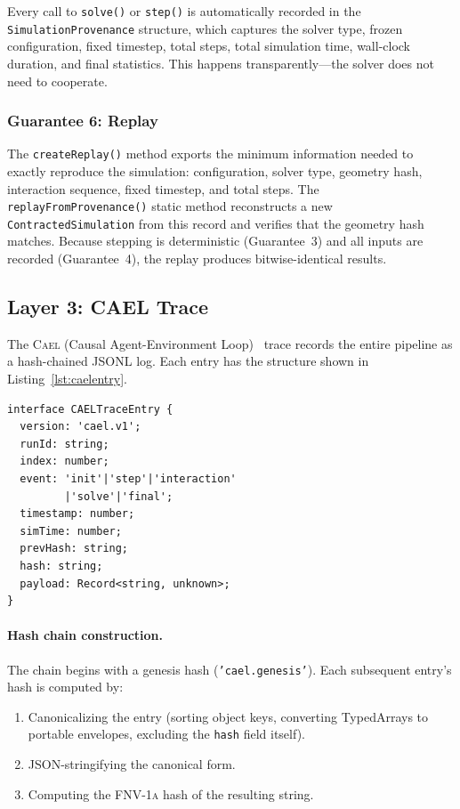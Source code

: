 \documentclass[letterpaper,twocolumn,10pt]{article}
\newcommand{\cael}{\textsc{Cael}}
\newcommand{\fnvhash}{\textsc{FNV-1a}}
\begin{document}
Every call to \texttt{solve()} or \texttt{step()} is automatically
recorded in the \texttt{SimulationProvenance} structure, which captures
the solver type, frozen configuration, fixed timestep, total steps,
total simulation time, wall-clock duration, and final statistics. This
happens transparently---the solver does not need to cooperate.

\subsubsection{Guarantee 6: Replay}

The \texttt{createReplay()} method exports the minimum information
needed to exactly reproduce the simulation: configuration, solver type,
geometry hash, interaction sequence, fixed timestep, and total steps.
The \texttt{replayFromProvenance()} static method reconstructs a new
\texttt{ContractedSimulation} from this record and verifies that the
geometry hash matches. Because stepping is deterministic (Guarantee~3)
and all inputs are recorded (Guarantee~4), the replay produces
bitwise-identical results.

\subsection{Layer 3: CAEL Trace}

The \cael{} (Causal Agent-Environment Loop)~\cite{cael-paper} trace records the
entire pipeline as a hash-chained JSONL log. Each entry has the
structure shown in Listing~\ref{lst:caelentry}.

\begin{lstlisting}[caption={\cael{} trace entry. Each entry links to the previous via \texttt{prevHash}, forming a tamper-evident chain.}, label={lst:caelentry}]
interface CAELTraceEntry {
  version: 'cael.v1';
  runId: string;
  index: number;
  event: 'init'|'step'|'interaction'
         |'solve'|'final';
  timestamp: number;
  simTime: number;
  prevHash: string;
  hash: string;
  payload: Record<string, unknown>;
}
\end{lstlisting}

\paragraph{Hash chain construction.} The chain begins with a genesis
hash (\texttt{'cael.genesis'}). Each subsequent entry's hash is
computed by:

\begin{enumerate}[leftmargin=*,topsep=2pt,itemsep=1pt]
  \item Canonicalizing the entry (sorting object keys, converting
    TypedArrays to portable envelopes, excluding the \texttt{hash}
    field itself).
  \item JSON-stringifying the canonical form.
  \item Computing the \fnvhash{} hash of the resulting string.
\end{enumerate}
\end{document}
